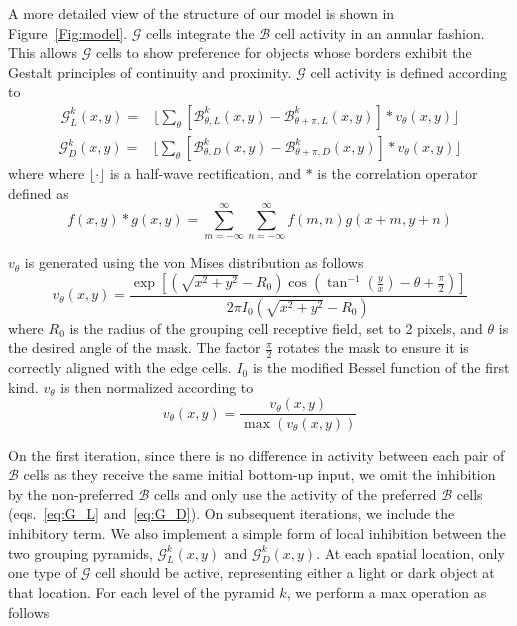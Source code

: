 A more detailed view of the structure of our model is shown in Figure~\ref{Fig:model}.
$\mathcal{G}$
cells integrate the 
 $\mathcal{B}$ cell activity
in an annular fashion. This allows $\mathcal{G}$ cells to show
preference for objects whose borders exhibit the Gestalt principles of
continuity and proximity. $\mathcal{G}$
cell activity is defined according to 
\begin{equation}
\begin{split}
\mathcal{G}_{L}^k(x,y) = &\Bigg\lfloor\sum_\theta
                     [\mathcal{B}^k_{\theta,L}(x,y)-\mathcal{B}^k_{\theta+\pi,L}(x,y)]\ast v_\theta(x,y)\Bigg\rfloor
\end{split}
\label{eq:G_L}
\end{equation}
\begin{equation}
\begin{split}
\mathcal{G}_{D}^k(x,y) = &\Bigg\lfloor\sum_\theta
                     [\mathcal{B}^k_{\theta,D}(x,y)-\mathcal{B}^k_{\theta+\pi,D}(x,y)]\ast v_\theta(x,y)\Bigg\rfloor
\end{split}
\label{eq:G_D}
\end{equation}
where where $\lfloor \cdot \rfloor$ is a half-wave rectification, and $\ast$ is the correlation operator defined as
\begin{equation}
f(x,y)\ast g(x,y) = \sum_{m=-\infty}^{\infty}\sum_{n=-\infty}^{\infty}f(m,n)g(x+m,y+n)
\end{equation}

$v_{\theta}$ is generated using the von Mises distribution as follows
\begin{equation}
v_\theta(x,y) = \frac{\exp\left[(\sqrt{x^2+y^2}-R_0)\cos(\tan^{-1}(\frac{y}{x})-\theta+\frac{\pi}{2})\right]}{2\pi I_0(\sqrt{x^2+y^2}-R_0)}
\label{eq:vonMises}
\end{equation}
where $R_0$ is the radius of the grouping cell receptive field, set to 2 pixels, and
$\theta$ is the desired angle of the mask. The factor $\frac{\pi}{2}$
rotates the mask to ensure it is correctly aligned with the edge
cells. $I_0$ is the modified Bessel function of the first kind.
$v_\theta$ is then normalized according to
\begin{equation}
v_\theta(x,y) = \frac{v_\theta(x,y)}{\max(v_\theta(x,y))}
\end{equation}

On the first iteration, since there is no difference in activity between each pair of 
$\mathcal{B}$
cells as they receive the same initial bottom-up input, we omit the inhibition by the non-preferred
$\mathcal{B}$
cells and only use the activity of the preferred
$\mathcal{B}$
cells (eqs.~\ref{eq:G_L} and~\ref{eq:G_D}). On subsequent iterations, we include the inhibitory term. We also implement a simple form of local inhibition between the two 
grouping pyramids, $\mathcal{G}^k_{L}(x,y)$ and $\mathcal{G}^k_{D}(x,y)$. At each spatial location, only one type of $\mathcal{G}$ cell should be active, representing either a light or dark object at that location. For each level of the pyramid $k$, we perform a max operation as follows

